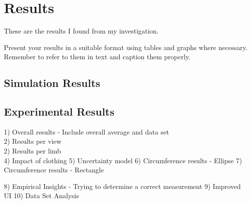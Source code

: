 \chapter{Results}
These are the results I found from my investigation.

Present your results in a suitable format using tables and graphs where necessary. Remember to refer
to them in text and caption them properly.


\section{Simulation Results}


\section{Experimental Results}

1) Overall results - Include overall average and data set\\

2) Results per view\\

2) Results per limb\\

4) Impact of clothing
5) Uncertainty model
6) Circumference results - Ellipse
7) Circumference results - Rectangle

8) Empirical Insights - Trying to determine a correct measurement
9) Improved UI
10) Data Set Analysis

